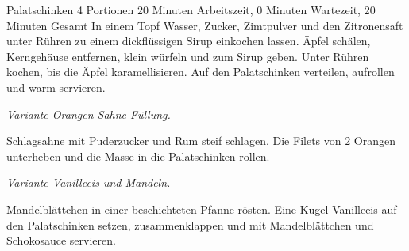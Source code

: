 \begin{recipe}{Palatschinken} {4 Portionen} {20 Minuten Arbeitszeit, 0 Minuten Wartezeit, 20 Minuten Gesamt}
  In einem Topf Wasser, Zucker, Zimtpulver und den Zitronensaft unter Rühren zu einem dickflüssigen Sirup einkochen lassen.
  Äpfel schälen, Kerngehäuse entfernen, klein würfeln und zum Sirup geben.
  Unter Rühren kochen, bis die Äpfel karamellisieren.
  Auf den Palatschinken verteilen, aufrollen und warm servieren.

  \freeform{}\hrulefill{}

  \freeform{}\textit{Variante Orangen-Sahne-Füllung.}


  Schlagsahne mit Puderzucker und Rum steif schlagen.
  Die Filets von 2 Orangen unterheben und die Masse in die Palatschinken rollen.

  \freeform{}\hrulefill{}

  \freeform{}\textit{Variante Vanilleeis und Mandeln.}


  Mandelblättchen in einer beschichteten Pfanne rösten.
  Eine Kugel Vanilleeis auf den Palatschinken setzen, zusammenklappen und mit Mandelblättchen und Schokosauce servieren.

  \freeform{}\hrulefill{}

\end{recipe}

